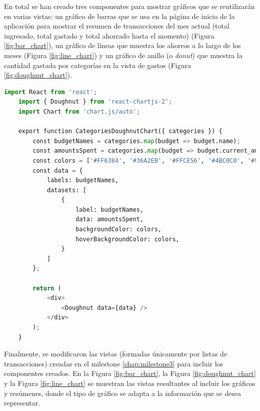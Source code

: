 En total se han creado tres componentes para mostrar gráficos que se reutilizarán en varias vistas: un gráfico de barras que se usa en la página de inicio de la aplicación para mostrar el resumen de transacciones del mes actual (total ingresado, total gastado y total ahorrado hasta el momento) (Figura \ref{fig:bar_chart}), un gráfico de líneas que muestra los ahorros a lo largo de los meses (Figura \ref{fig:line_chart}) y un gráfico de anillo (o \textit{donut}) que muestra la cantidad gastada por categorías en la vista de gastos (Figura \ref{fig:doughnut_chart}). 

\begin{lstlisting}[language=Python, caption=Componente de React para el gráfico de tipo donut]
    import React from 'react';
    import { Doughnut } from 'react-chartjs-2';
    import Chart from 'chart.js/auto';
    
    export function CategoriesDoughnutChart({ categories }) {
        const budgetNames = categories.map(budget => budget.name);
        const amountsSpent = categories.map(budget => budget.current_amount_spent);
        const colors = ['#FF6384', '#36A2EB', '#FFCE56', '#4BC0C0', '#9966FF', '#FF9F40'];
        const data = {
            labels: budgetNames,
            datasets: [
                {
                    label: budgetNames,
                    data: amountsSpent,
                    backgroundColor: colors,
                    hoverBackgroundColor: colors,
                }
            ]
        };
    
        return (
            <div>
                <Doughnut data={data} />
            </div>
        );
    }    
\end{lstlisting}


Finalmente, se modificaron las vistas (formadas únicamente por listas de transacciones) creadas en el milestone \ref{chap:milestone3} para incluir los componentes creados. En la Figura \ref{fig:bar_chart}, la Figura \ref{fig:doughnut_chart} y la Figura \ref{fig:line_chart} se muestran las vistas resultantes al incluir los gráficos y resúmenes, donde el tipo de gráfico se adapta a la información que se desea representar.

